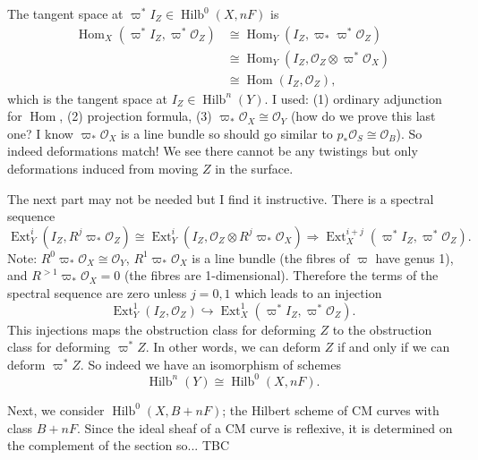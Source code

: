 \documentclass{amsart}
\theoremstyle{definition}
\renewcommand{\O}{\mathcal{O}}
\newcommand{\Hom}{\operatorname{Hom}}
\newcommand{\Ext}{\operatorname{Ext}}
\newcommand{\Hilb}{\operatorname{Hilb}}
\begin{document}
The tangent space at $\varpi^* I_Z \in \Hilb^0(X,nF)$ is
\begin{align*}
\Hom_X(\varpi^* I_Z , \varpi^* \O_Z) &\cong \Hom_Y(I_Z , \varpi_* \varpi^* \O_Z) \\
&\cong \Hom_Y(I_Z , \O_Z \otimes  \varpi^* \O_X) \\
&\cong \Hom(I_Z,\O_Z),
\end{align*}
which is the tangent space at $I_Z \in \Hilb^n(Y)$. I used: (1) ordinary adjunction for $\Hom$, (2) projection formula, (3) $\varpi_* \O_X \cong \O_Y$ (how do we prove this last one? I know $\varpi_* \O_X$ is a line bundle so should go similar to $p_* \O_S \cong \O_B$). So indeed deformations match! We see there cannot be any twistings but only deformations induced from moving $Z$ in the surface. 

The next part may not be needed but I find it instructive. There is a spectral sequence
$$
\Ext^{i}_{Y}(I_Z, R^j \varpi_* \O_Z) \cong \Ext^{i}_{Y}(I_Z, \O_Z \otimes R^j \varpi_* \O_X) \Rightarrow \Ext^{i+j}_{X}(\varpi^* I_Z, \varpi^* \O_Z).
$$
Note: $R^0 \varpi_* \O_X \cong \O_Y$, $R^1 \varpi_* \O_X$ is a line bundle (the fibres of $\varpi$ have genus 1), and $R^{>1} \varpi_* \O_X = 0$ (the fibres are 1-dimensional). Therefore the terms of the spectral sequence are zero unless $j=0,1$ which leads to an injection
$$
\Ext^{1}_{Y}(I_Z,\O_Z) \hookrightarrow \Ext^{1}_{X}(\varpi^* I_Z ,\varpi^* \O_Z).
$$
This injections maps the obstruction class for deforming $Z$ to the obstruction class for deforming $\varpi^* Z$. In other words, we can deform $Z$ if and only if we can deform $\varpi^* Z$. So indeed we have an isomorphism of schemes
$$
\Hilb^n(Y) \cong \Hilb^0(X,nF).
$$

Next, we consider $\Hilb^0(X,B+nF)$; the Hilbert scheme of CM curves with class $B+nF$. Since the ideal sheaf of a CM curve is reflexive, it is determined on the complement of the section so... TBC
\end{document}
